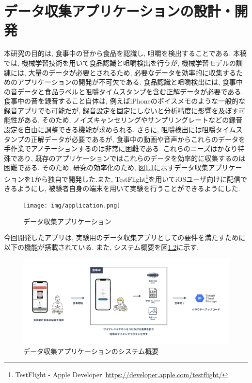 
\chapter{データ収集アプリケーションの設計・開発}

本研究の目的は, 食事中の音から食品を認識し, 咀嚼を検出することである. 本稿では, 機械学習技術を用いて食品認識と咀嚼検出を行うが, 機械学習モデルの訓練には, 大量のデータが必要とされるため, 必要なデータを効率的に収集するためのアプリケーションの開発が不可欠である. 食品認識と咀嚼検出には, 食事中の音データと食品ラベルと咀嚼タイムスタンプを含む正解データが必要である. 食事中の音を録音すること自体は, 例えばiPhoneのボイスメモのような一般的な録音アプリでも可能だが, 録音設定を固定にしないと分析精度に影響を及ぼす可能性がある. そのため, ノイズキャンセリングやサンプリングレートなどの録音設定を自由に調整できる機能が求められる. さらに, 咀嚼検出には咀嚼タイムスタンプの正解データが必要であるが, 食事中の動画や音声からこれらのデータを手作業でアノテーションするのは非常に困難である. これらのニーズはかなり特殊であり, 既存のアプリケーションではこれらのデータを効率的に収集するのは困難である. そのため, 研究の効率化のため, 図\ref{fig:application}に示すデータ収集アプリケーションを1から独自で開発した.また, TestFlight\footnote{TestFlight - Apple Developer~\url{https://developer.apple.com/testflight/}}を用いてiOSユーザ向けに配信できるようにし, 被験者自身の端末を用いて実験を行うことができるようにした.

\begin{figure}[t]
    \begin{center}
        \texttt{[image: img/application.png]}
        \caption{データ収集アプリケーション}
        \label{fig:application}
    \end{center}
\end{figure}

今回開発したアプリは, 実験用のデータ収集アプリとしての要件を満たすために以下の機能が搭載されている. また, システム概要を図\ref{fig:application-abst}に示す.

\begin{figure}[t]
    \begin{center}
        \includegraphics[clip,  width=0.95\hsize]{img/application-abst.png}
        \caption{データ収集アプリケーションのシステム概要}
        \label{fig:application-abst}
    \end{center}
\end{figure}

